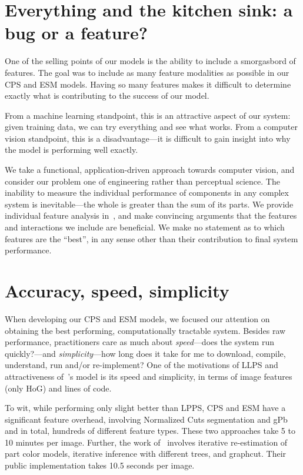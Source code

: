 \section{Everything and the kitchen sink: a bug or a feature?}
One of the selling points of our models is the ability to include a smorgasbord 
of features.  The goal was to include as many feature modalities as possible in 
our CPS and ESM models.  Having so many features makes it difficult to 
determine exactly what is contributing to the success of our model.  

From a machine learning standpoint, this is an attractive aspect of our system: 
given training data, we can try everything and see what works.  From a computer 
vision standpoint, this is a disadvantage---it is difficult to gain insight 
into why the model is performing well exactly.

We take a functional, application-driven approach towards computer vision, and 
consider our problem one of engineering rather than perceptual science.  The 
inability to measure the individual performance of components in any complex 
system is inevitable---the whole is greater than the sum of its parts.  We 
provide individual feature analysis in~, and make convincing 
arguments that the features and interactions we include are beneficial.  We 
make no statement as to which features are the ``best'', in any sense other 
than their contribution to final system performance.

\section{Accuracy, speed, simplicity}

When developing our CPS and ESM models, we focused our attention on obtaining 
the best performing, computationally tractable system.  Besides raw 
performance, practitioners care as much about {\em speed}---does the system run 
quickly?---and {\em simplicity}---how long does it take for me to download, 
compile, understand, run and/or re-implement?  One of the motivations of LLPS 
and attractiveness of~\citet{deva2011}'s model is its speed and simplicity, in 
terms of image features (only HoG) and lines of code.

To wit, while performing only slight better than LPPS, CPS and ESM have a 
significant feature overhead, involving Normalized Cuts segmentation and gPb 
and in total, hundreds of different feature types.  These two approaches take 5 
to 10 minutes per image.  Further, the work of~\citet{eichner09} involves 
iterative re-estimation of part color models, iterative inference with 
different trees, and graphcut.  Their public implementation takes 10.5 seconds 
per image.


